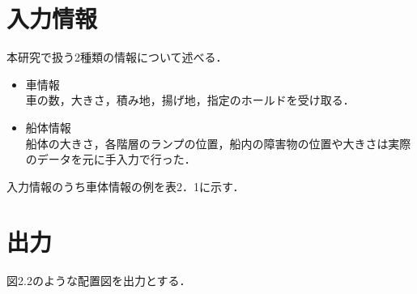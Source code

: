 \section{入力情報}
本研究で扱う2種類の情報について述べる．

\begin{itemize}
    \item 車情報 \\
    車の数，大きさ，積み地，揚げ地，指定のホールドを受け取る．
    \item 船体情報 \\
    船体の大きさ，各階層のランプの位置，船内の障害物の位置や大きさは実際のデータを元に手入力で行った．
\end{itemize}
入力情報のうち車体情報の例を表2．1に示す．

\section{出力}
図2.2のような配置図を出力とする．

